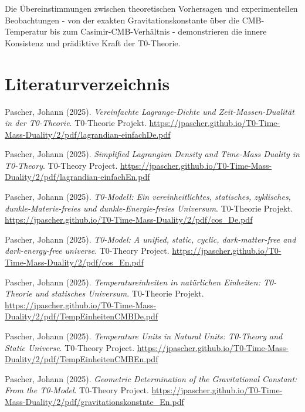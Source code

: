 \documentclass[12pt,a4paper]{article}
\begin{document}
	Die Übereinstimmungen zwischen theoretischen Vorhersagen und experimentellen Beobachtungen - von der exakten Gravitationskonstante über die CMB-Temperatur bis zum Casimir-CMB-Verhältnis - demonstrieren die innere Konsistenz und prädiktive Kraft der T0-Theorie.
	
	\section{Literaturverzeichnis}
	
	\begin{thebibliography}{20}
		
		Pascher, Johann (2025). 
		\textit{Vereinfachte Lagrange-Dichte und Zeit-Massen-Dualit\"at in der T0-Theorie}. 
		T0-Theorie Projekt. 
		\url{https://jpascher.github.io/T0-Time-Mass-Duality/2/pdf/lagrandian-einfachDe.pdf}
		
		Pascher, Johann (2025). 
		\textit{Simplified Lagrangian Density and Time-Mass Duality in T0-Theory}. 
		T0-Theory Project. 
		\url{https://jpascher.github.io/T0-Time-Mass-Duality/2/pdf/lagrandian-einfachEn.pdf}
		
		Pascher, Johann (2025). 
		\textit{T0-Modell: Ein vereinheitlichtes, statisches, zyklisches, dunkle-Materie-freies und dunkle-Energie-freies Universum}. 
		T0-Theorie Projekt. 
		\url{https://jpascher.github.io/T0-Time-Mass-Duality/2/pdf/cos_De.pdf}
		
		Pascher, Johann (2025). 
		\textit{T0-Model: A unified, static, cyclic, dark-matter-free and dark-energy-free universe}. 
		T0-Theory Project. 
		\url{https://jpascher.github.io/T0-Time-Mass-Duality/2/pdf/cos_En.pdf}
		
		Pascher, Johann (2025). 
		\textit{Temperatureinheiten in nat\"urlichen Einheiten: T0-Theorie und statisches Universum}. 
		T0-Theorie Projekt. 
		\url{https://jpascher.github.io/T0-Time-Mass-Duality/2/pdf/TempEinheitenCMBDe.pdf}
		
		Pascher, Johann (2025). 
		\textit{Temperature Units in Natural Units: T0-Theory and Static Universe}. 
		T0-Theory Project. 
		\url{https://jpascher.github.io/T0-Time-Mass-Duality/2/pdf/TempEinheitenCMBEn.pdf}
		
		Pascher, Johann (2025). 
		\textit{Geometric Determination of the Gravitational Constant: From the T0-Model}. 
		T0-Theory Project. 
		\url{https://jpascher.github.io/T0-Time-Mass-Duality/2/pdf/gravitationskonstnte_En.pdf}
		

\end{thebibliography}
\end{document}
